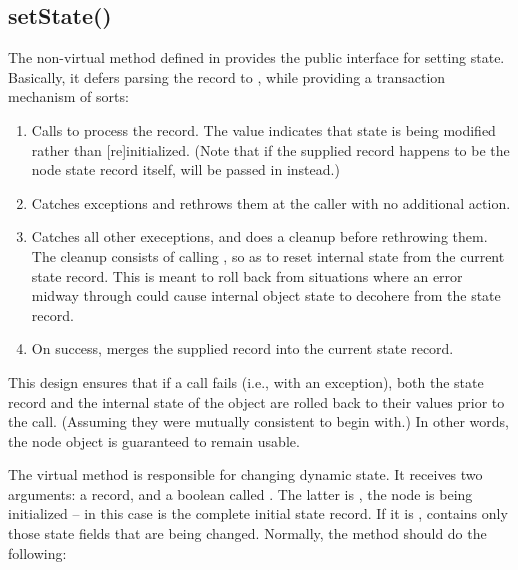\subsection{setState()}


  The non-virtual  method defined in  provides the
  public interface for setting state. Basically, it defers parsing the record
  to , while providing a transaction mechanism of sorts:

\begin{enumerate}

  \item Calls  to process the record. The
     value indicates that state is being modified rather than
    [re]initialized. (Note that if the supplied record happens to be the node
    state record itself,  will be passed in instead.)

  \item Catches  exceptions and rethrows them at
    the caller with no additional action.

  \item Catches all other execeptions, and does a cleanup before rethrowing
    them. The cleanup consists of calling , so
    as to reset internal state from the current state record. This is meant to
    roll back from situations where an error midway through 
    could cause internal object state to decohere from the state record.

  \item On success, merges the supplied record into the current state record.

  \end{enumerate}

  This design ensures that if a  call fails (i.e., with an
  exception), both the state record and the internal state of the object are
  rolled back to their values prior to the call. (Assuming they were mutually
  consistent to begin with.) In other words, the node object is guaranteed to
  remain usable.

  The virtual  method is responsible for changing dynamic
  state. It receives two arguments: a  record, and a boolean called
  . The latter is , the node is being initialized --
  in this case  is the complete initial state record. If it is
  ,  contains only those state fields that are being
  changed. Normally, the method should do the following:

